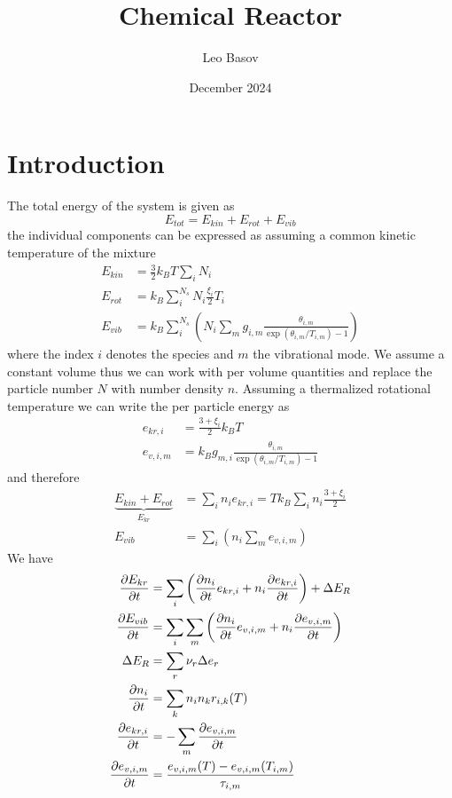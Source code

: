 \documentclass{scrreprt}
\title{Chemical Reactor}
\author{Leo Basov}
\date{December 2024}
\begin{document}
\maketitle

\chapter{Introduction}
The total energy of the system is given as
\begin{equation}
	E_{tot} = E_{kin} + E_{rot} + E_{vib}
\end{equation}
the individual components can be expressed as assuming a common kinetic temperature of the mixture
\begin{align}
	E_{kin} &= \frac{3}{2} k_B T \sum_i N_i\\
	E_{rot} &= k_B \sum_i^{N_s} N_i \frac{\xi_i}{2} T_i\\
	E_{vib} &= k_B \sum_i^{N_s} \left( N_i \sum_m g_{i, m} \frac{\theta_{i, m}}{\exp(\theta_{i, m} / T_{i, m}) - 1} \right)
\end{align}
where the index $i$ denotes the species and $m$ the vibrational mode.
We assume a constant volume thus we can work with per volume quantities and replace the particle number $N$ with number density $n$.
Assuming a thermalized rotational temperature we can write the per particle energy as
\begin{align}
	e_{kr, i} &= \frac{3 + \xi_i}{2} k_B T\\
	e_{v, i, m} &= k_B g_{m, i} \frac{\theta_{i, m}}{\exp(\theta_{i, m} / T_{i, m}) - 1}
\end{align}
and therefore
\begin{align}
	\underbrace{E_{kin} + E_{rot}}_{E_{kr}} &= \sum_i n_i e_{kr, i} = T k_B \sum_i n_i \frac{3 + \xi_i}{2}\\
	E_{vib} &= \sum_i \left( n_i \sum_m e_{v, i, m}\right)
\end{align}
We have
\begin{align}
	\pdv{E_{kr}}{t} &= \sum_i \left( \pdv{n_i}{t} e_{kr, i} + n_i \pdv{e_{kr, i}}{t} \right) + \Delta E_R\\
	\pdv{E_{vib}}{t} &= \sum_i \sum_m \left( \pdv{n_i}{t} e_{v, i, m} + n_i \pdv{e_{v, i, m}}{t} \right)\\
	\Delta E_R &= \sum_r \nu_r \Delta e_r\\
	\frac{\partial n_i}{\partial t} &= \sum_k n_i n_k r_{i, k}(T)\\
	\pdv{e_{kr, i}}{t} &= -\sum_m \pdv{e_{v, i, m}}{t}\\
	\frac{\partial e_{v, i, m}}{\partial t} &= \frac{e_{v, i, m}(T) - e_{v, i, m}(T_{i,m})}{\tau_{i, m}}
\end{align}
\end{document}
